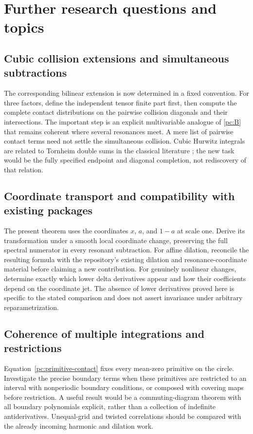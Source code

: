 \documentclass[11pt,a4paper]{article}
\numberwithin{equation}{section}
\theoremstyle{definition}
\begin{document}
\section{Further research questions and topics}\label{pc:further}
\subsection{Cubic collision extensions and simultaneous subtractions}
The corresponding bilinear extension is now determined in a fixed convention. For three factors, define the independent tensor finite part first, then compute the complete contact distributions on the pairwise collision diagonals and their intersections. The important step is an explicit multivariable analogue of \eqref{pc:B} that remains coherent where several resonances meet. A mere list of pairwise contact terms need not settle the simultaneous collision. Cubic Hurwitz integrals are related to Tornheim double sums in the classical literature \cite{pc:Tornheim}; the new task would be the fully specified endpoint and diagonal completion, not rediscovery of that relation.

\subsection{Coordinate transport and compatibility with existing packages}
The present theorem uses the coordinates $x$, $a$, and $1-a$ at scale one. Derive its transformation under a smooth local coordinate change, preserving the full spectral numerator in every resonant subtraction. For affine dilation, reconcile the resulting formula with the repository's existing dilation and resonance-coordinate material before claiming a new contribution. For genuinely nonlinear changes, determine exactly which lower delta derivatives appear and how their coefficients depend on the coordinate jet. The absence of lower derivatives proved here is specific to the stated comparison and does not assert invariance under arbitrary reparametrization.

\subsection{Coherence of multiple integrations and restrictions}
Equation~\eqref{pc:primitive-contact} fixes every mean-zero primitive on the circle. Investigate the precise boundary terms when these primitives are restricted to an interval with nonperiodic boundary conditions, or composed with covering maps before restriction. A useful result would be a commuting-diagram theorem with all boundary polynomials explicit, rather than a collection of indefinite antiderivatives. Unequal-grid and twisted correlations should be compared with the already incoming harmonic and dilation work.
\end{document}
